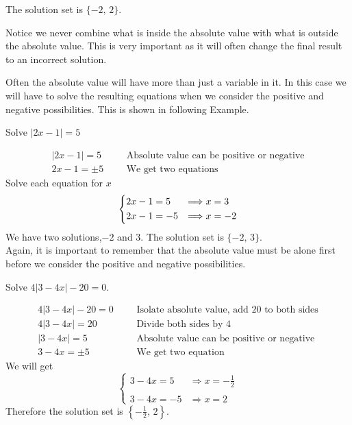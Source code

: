 The solution set is $\{-2,\,2\}$.
\begin{nt}
    Notice we never combine what is inside the absolute value with what is outside the absolute value. This is very important as it will often change the final result to an incorrect solution.
\end{nt}
Often the absolute value will have more than just a variable in it. In this case we will have to solve the resulting equations when we consider the positive and negative possibilities. This is shown in following Example.
\begin{exa}
    Solve $|2x-1|=5$
\end{exa}
\begin{align*}
    |2x-1| = 5& &   &\text{Absolute value can be positive or negative}\\
    2x-1=\pm 5& &   &\text{We get two equations}
\end{align*}
Solve each equation for $x$
\[ \begin{dcases}
    2x-1=5  &   \Longrightarrow   x=3\\
    2x-1=-5 &   \Longrightarrow  x=-2
\end{dcases}\]
We have two solutions,$-2$ and $3$. The solution set is $\{-2,\, 3\}$.\\
Again, it is important to remember that the absolute value must be alone first before we consider the positive and negative possibilities.
\begin{exa}
    Solve $4|3-4x|-20=0$.
\end{exa}
\begin{align*}
    4|3-4x|-20=0&   &   &\text{Isolate absolute value, add 20 to both sides}\\
    4|3-4x| = 20&   &   &\text{Divide both sides by 4}\\
    |3-4x| = 5& &   &\text{Absolute value can be positive or negative}\\
    3-4x = \pm 5& &   &\text{We get two equation}
\end{align*}
We will get
	\[ \begin{cases}
		3-4x=5  & \Longrightarrow x=-\frac{1}{2} \\
		&\\
		3-4x=-5 & \Longrightarrow x=2
	\end{cases} \]
Therefore the solution set is $\left\{-\frac{1}{2},\,2 \right\}$.